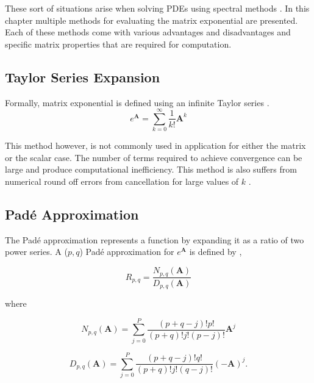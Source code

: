 \noindent
These sort of situations arise when solving PDEs using spectral methods \cite{ash2009} \cite{cox2002} \cite{kazimi1990}. In this chapter multiple methods for evaluating the matrix exponential are presented. Each of these methods come with various advantages and disadvantages and specific matrix properties that are required for computation. 



\subsection{Taylor Series Expansion}
Formally,  matrix exponential is defined using an infinite Taylor series \cite{exokit} \cite{moler2003} \cite{pusa2010}. 
\begin{equation}
    e^{\boldsymbol{A}} = \sum_{k = 0}^{\infty}\frac{1}{k!}\boldsymbol{A}^{k}
    \label{eq:power_series_exp}
\end{equation}

\noindent This method however, is not commonly used in application for either the matrix or the scalar case. The number of terms required to achieve convergence can be large and produce computational inefficiency. This method is also suffers from numerical round off errors from cancellation for large values of $k$ \cite{moler2003}. 


\subsection{Pad\'e Approximation}
The Pad\'e approximation represents a function by expanding it as a ratio of two power series. A ($p,q$) Pad\'e approximation for $e^{\boldsymbol{A}}$ is defined by \cite{moler2003}, 

\begin{equation}
    R_{p,q} = \frac{N_{p,q}(\boldsymbol{A})}{D_{p,q}(\boldsymbol{A})}
    \label{eq:padeApprox}
\end{equation}

\noindent where

\begin{equation*}
    N_{p,q}(\boldsymbol{A}) = \sum_{j=0}^{P}\frac{(p + q - j)!p!}{(p + q)!j!(p - j)!}\boldsymbol{A}^{j}
\end{equation*}

\begin{equation*}
    D_{p,q}(\boldsymbol{A}) = \sum_{j=0}^{P}\frac{(p + q - j)!q!}{(p + q)!j!(q - j)!}(-\boldsymbol{A})^{j}.
\end{equation*}

